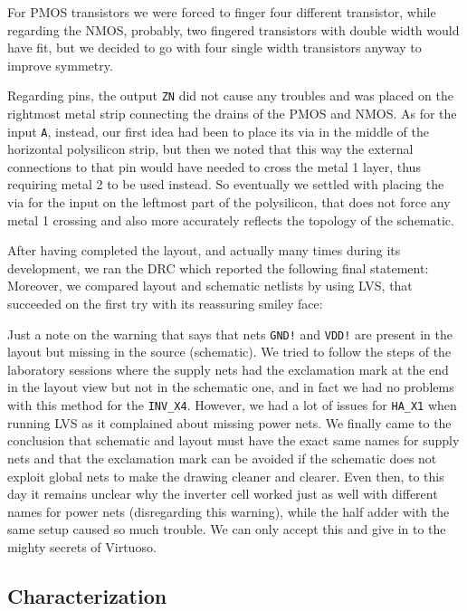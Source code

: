 \documentclass[a4paper]{article}
\newcommand{\inv}{\texttt{INV\_X4}\xspace}
\newcommand{\ha}{\texttt{HA\_X1}\xspace}
\begin{document}
For PMOS transistors we were forced to finger four different transistor, while regarding the NMOS, probably, two fingered transistors with double width would have fit, but we decided to go with four single width transistors anyway to improve symmetry.

Regarding pins, the output \texttt{ZN} did not cause any troubles and was placed on the rightmost metal strip connecting the drains of the PMOS and NMOS. As for the input \texttt{A}, instead, our first idea had been to place its via in the middle of the horizontal polysilicon strip, but then we noted that this way the external connections to that pin would have needed to cross the metal 1 layer, thus requiring metal 2 to be used instead. So eventually we settled with placing the via for the input on the leftmost part of the polysilicon, that does not force any metal 1 crossing and also more accurately reflects the topology of the schematic.

After having completed the layout, and actually many times during its development, we ran the DRC which reported the following final statement:
\newpage
{}
\newpage
Moreover, we compared layout and schematic netlists by using LVS, that succeeded on the first try with its reassuring smiley face:

Just a note on the warning that says that nets \texttt{GND!} and \texttt{VDD!} are present in the layout but missing in the source (schematic). We tried to follow the steps of the laboratory sessions where the supply nets had the exclamation mark at the end in the layout view but not in the schematic one, and in fact we had no problems with this method for the \inv. However, we had a lot of issues for \ha when running LVS as it complained about missing power nets. We finally came to the conclusion that schematic and layout must have the exact same names for supply nets and that the exclamation mark can be avoided if the schematic does not exploit global nets to make the drawing cleaner and clearer. Even then, to this day it remains unclear why the inverter cell worked just as well with different names for power nets (disregarding this warning), while the half adder with the same setup caused so much trouble. We can only accept this and give in to the mighty secrets of Virtuoso.


\subsection{Characterization}
\end{document}
